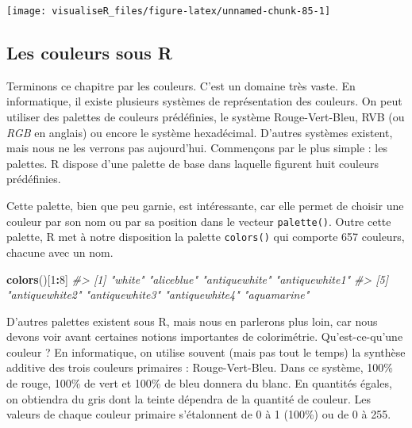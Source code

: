 \documentclass[]{article}
\newenvironment{Shaded}{\begin{snugshade}}{\end{snugshade}}
\newcommand{\CommentTok}[1]{\textcolor[rgb]{0.56,0.35,0.01}{\textit{#1}}}
\newcommand{\DecValTok}[1]{\textcolor[rgb]{0.00,0.00,0.81}{#1}}
\newcommand{\KeywordTok}[1]{\textcolor[rgb]{0.13,0.29,0.53}{\textbf{#1}}}
\newcommand{\NormalTok}[1]{#1}
\newcommand{\OperatorTok}[1]{\textcolor[rgb]{0.81,0.36,0.00}{\textbf{#1}}}
\begin{document}
\begin{center}\texttt{[image: visualiseR\_files/figure-latex/unnamed-chunk-85-1]} \end{center}

\hypertarget{les-couleurs-sous-r}{%
\subsection{Les couleurs sous R}\label{les-couleurs-sous-r}}

Terminons ce chapitre par les couleurs. C'est un domaine très vaste. En
informatique, il existe plusieurs systèmes de représentation des couleurs. On
peut utiliser des palettes de couleurs prédéfinies, le système Rouge-Vert-Bleu,
RVB (ou \emph{RGB} en anglais) ou encore le système hexadécimal. D'autres systèmes
existent, mais nous ne les verrons pas aujourd'hui. Commençons par le plus
simple : les palettes. R dispose d'une palette de base dans laquelle figurent
huit couleurs prédéfinies.

\begin{Shaded}
\end{Shaded}

Cette palette, bien que peu garnie, est intéressante, car elle permet de choisir une couleur par son nom ou par sa position dans le vecteur \texttt{palette()}. Outre cette palette, R met à notre disposition la palette \texttt{colors()} qui comporte 657 couleurs, chacune avec un nom.

\begin{Shaded}
\begin{Highlighting}[]
\KeywordTok{colors}\NormalTok{()[}\DecValTok{1}\OperatorTok{:}\DecValTok{8}\NormalTok{]}
\CommentTok{#> [1] "white"         "aliceblue"     "antiquewhite"  "antiquewhite1"}
\CommentTok{#> [5] "antiquewhite2" "antiquewhite3" "antiquewhite4" "aquamarine"}
\end{Highlighting}
\end{Shaded}

D'autres palettes existent sous R, mais nous en parlerons plus loin, car nous
devons voir avant certaines notions importantes de colorimétrie.
Qu'est-ce-qu'une couleur ? En informatique, on utilise souvent (mais pas tout le
temps) la synthèse additive des trois couleurs primaires : Rouge-Vert-Bleu. Dans
ce système, 100\% de rouge, 100\% de vert et 100\% de bleu donnera du blanc. En
quantités égales, on obtiendra du gris dont la teinte dépendra de la quantité de
couleur. Les valeurs de chaque couleur primaire s'étalonnent de 0 à 1 (100\%) ou
de 0 à 255.
\end{document}
